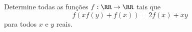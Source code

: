 Determine todas as funções $f: \RR \to \RR$ tais que
$$f(xf(y)+f(x)) = 2f(x) + xy$$
para todos $x$ e $y$ reais.
